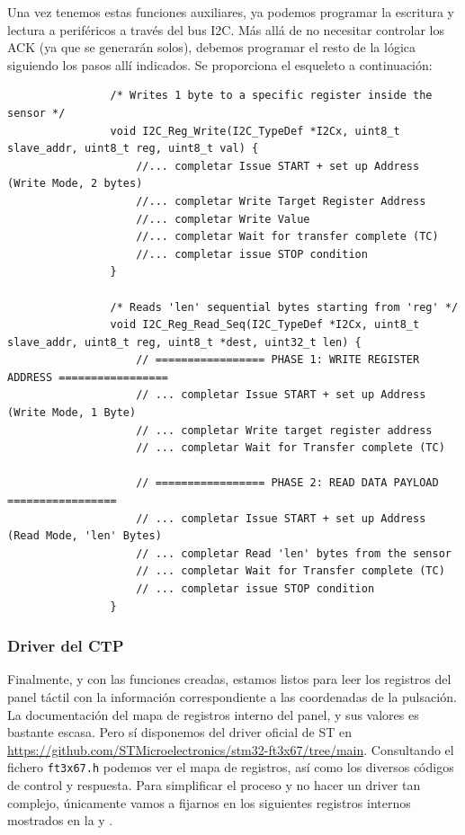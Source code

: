 \documentclass[../main.tex]{subfiles}
\begin{document}
            Una vez tenemos estas funciones auxiliares, ya podemos programar la escritura y lectura a periféricos a través del bus I2C. Más allá de no necesitar controlar los ACK (ya que se generarán solos), debemos programar el resto de la lógica siguiendo los pasos allí indicados. Se proporciona el esqueleto a continuación:
            
            \begin{lstlisting}
                /* Writes 1 byte to a specific register inside the sensor */
                void I2C_Reg_Write(I2C_TypeDef *I2Cx, uint8_t slave_addr, uint8_t reg, uint8_t val) {
                    //... completar Issue START + set up Address (Write Mode, 2 bytes)
                    //... completar Write Target Register Address
                    //... completar Write Value
                    //... completar Wait for transfer complete (TC)
                    //... completar issue STOP condition
                }

                /* Reads 'len' sequential bytes starting from 'reg' */
                void I2C_Reg_Read_Seq(I2C_TypeDef *I2Cx, uint8_t slave_addr, uint8_t reg, uint8_t *dest, uint32_t len) {
                    // ================= PHASE 1: WRITE REGISTER ADDRESS =================
                    // ... completar Issue START + set up Address (Write Mode, 1 Byte)
                    // ... completar Write target register address
                    // ... completar Wait for Transfer complete (TC)

                    // ================= PHASE 2: READ DATA PAYLOAD =================
                    // ... completar Issue START + set up Address (Read Mode, 'len' Bytes)
                    // ... completar Read 'len' bytes from the sensor
                    // ... completar Wait for Transfer complete (TC)
                    // ... completar issue STOP condition
                }
            \end{lstlisting}

        \subsubsection{Driver del CTP}

            Finalmente, y con las funciones  creadas, estamos listos para leer los registros del panel táctil con la información correspondiente a las coordenadas de la pulsación. La documentación del mapa de registros interno del panel, y sus valores es bastante escasa. Pero sí disponemos del driver oficial de ST en \url{https://github.com/STMicroelectronics/stm32-ft3x67/tree/main}. Consultando el fichero \texttt{ft3x67.h} podemos ver el mapa de registros, así como los diversos códigos de control y respuesta. Para simplificar el proceso y no hacer un driver tan complejo, únicamente vamos a fijarnos en los siguientes registros internos mostrados en la  y .
\end{document}
